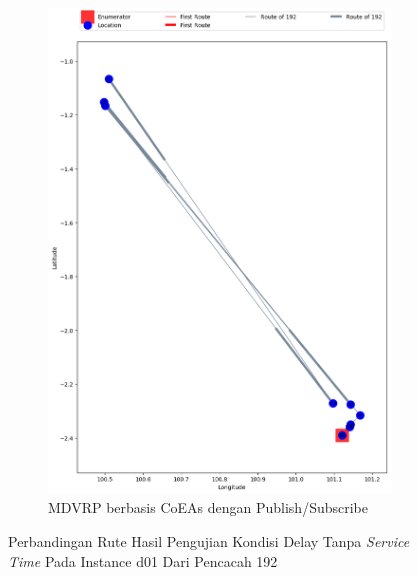 \begin{figure}[H]\ContinuedFloat
	\centering
	\begin{subfigure}[t]{\textwidth}
		\centering
		\includegraphics[width=\textwidth]{Resources/Images/delayed_1/real_m15_n100_delayed_1_192_pubsub_coes}
		\caption{MDVRP berbasis CoEAs dengan Publish/Subscribe}
		\label{fig:real_m15_n100_delayed_1_192_pubsub_coes}
	\end{subfigure}
	\caption{Perbandingan Rute Hasil Pengujian Kondisi Delay Tanpa \textit{Service Time} Pada Instance d01 Dari Pencacah 192}
	\label{fig:real_m15_n100_delayed_1_192_contd}
\end{figure}


